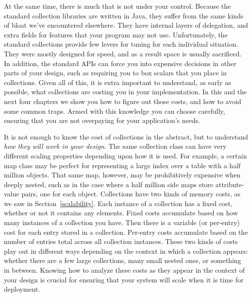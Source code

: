 At the same time, there is much that is not under your control.
Because the standard collection libraries are written in Java, they suffer from
the same kinds of bloat we've encountered elsewhere. They have internal layers
of delegation, and extra fields for features that your program may not
use. Unfortunately, the standard collections provide few levers for
tuning for each individual situation. They were
mostly designed for speed, and as a result space is usually sacrificed. In
addition, the standard APIs can force you into expensive decisions in other
parts of your design, such as requiring you to box scalars that you place in
collections. Given all of this, it is extra important to understand, as early as possible,
what collections are costing you in your implementation. In this and
the next four chapters we show you how to figure out those costs, and how
to avoid some common traps. Armed with this
knowledge you can choose carefully, ensuring that you are not
overpaying for your application's needs.

It is not enough to know the cost
of collections in the abstract, but to understand \emph{how they will work in
your design}. The same collection class can have very different scaling
properties depending upon how it is used. For example, a certain map class may
be perfect for representing a large index over a table with a half million
objects. That same map, however, may be prohibitively expensive
when deeply nested, such as in the case where a half million side maps
store attribute-value pairs, one for each object. %
Collections have two kinds of memory costs, as we saw in
Section~\ref{scalability}. Each instance of a collection has a fixed cost,
whether or not it contains any elements. Fixed costs accumulate based on
how many instances of a collection you have. Then there is a variable (or
per-entry) cost for each entry stored in a collection.
Per-entry costs accumulate based on the number of entries total across all
collection instances. These two kinds of costs play out in different ways
depending on the context in which a collection appears: whether there are a few large collections,
many small nested ones, or something in between.
Knowing how to analyze these costs as they appear in the context of your design
is crucial for ensuring that your system will scale when it is time for
deployment.

